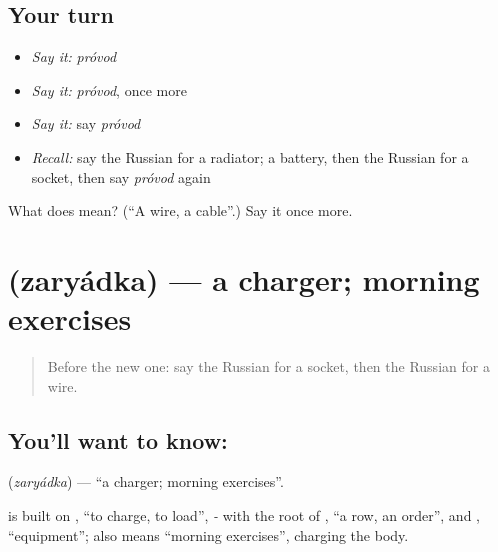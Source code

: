 \subsection*{Your turn}
\begin{itemize}
\raggedright
  \item \emph{Say it:} \emph{próvod}
  \item \emph{Say it:} \emph{próvod}, once more
  \item \emph{Say it:} say \emph{próvod}
  \item \emph{Recall:} say the Russian for a radiator; a battery, then the Russian for a socket, then say \emph{próvod} again
\end{itemize}

\begin{tcolorbox}[breakable,colback=teal!4,colframe=teal!35!black,title={Before you move on}]
What does  mean? (\textquotedblleft{}A wire, a cable\textquotedblright{}.) Say it once more.
\end{tcolorbox}
\section[\texorpdfstring{\ru{зарядка} (zaryádka)}{зарядка (zaryádka)}]{ (zaryádka) — a charger; morning exercises}

\label{lesson:RU-C191-zaryadka}



\begin{quote}
Before the new one: say the Russian for a socket, then the Russian for a wire.
\end{quote}

\subsection*{You'll want to know: }
\textbf{} (\emph{zaryádka}) — \textquotedblleft{}a charger; morning exercises\textquotedblright{}.

\begin{cousinweb}
\textbf{} is built on \emph{}, \textquotedblleft{}to charge, to load\textquotedblright{}, \emph{-} with the root of \emph{}, \textquotedblleft{}a row, an order\textquotedblright{}, and \emph{}, \textquotedblleft{}equipment\textquotedblright{}; \emph{} also means \textquotedblleft{}morning exercises\textquotedblright{}, charging the body.
\end{cousinweb}

